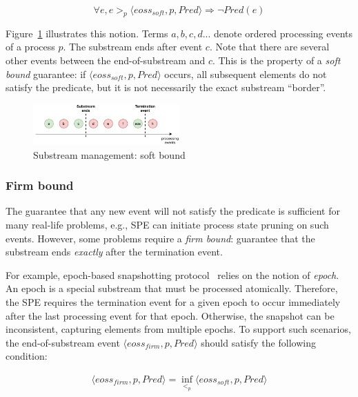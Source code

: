 \begin{equation}
\forall e, e >_p \langle eoss_{soft}, p, Pred\rangle \Rightarrow \neg Pred(e)
\end{equation}

Figure~\ref{general_guarantees} illustrates this notion. Terms $a,b,c,d...$ denote ordered processing events of a process $p$. The substream ends after event $c$. Note that there are several other events between the end-of-substream and $c$. This is the property of a {\em soft bound} guarantee: if $\langle eoss_{soft}, p, Pred\rangle$ occurs, all subsequent elements do not satisfy the predicate, but it is not necessarily the exact substream ``border''.

\begin{figure}[t]
  \centering
  \includegraphics[width=0.50\textwidth]{pics/general-guarantee.pdf}
  \caption{Substream management: soft bound}
  \label{general_guarantees}
\end{figure}

\subsubsection{Firm bound}

The guarantee that any new event will not satisfy the predicate is sufficient for many real-life problems, e.g., SPE can initiate process state pruning on such events. However, some problems require a {\em firm bound}: guarantee that the substream ends {\em exactly} after the termination event. 

For example, epoch-based snapshotting protocol~\cite{2015arXiv150608603C, jacques2016consistent} relies on the notion of {\em epoch}. An epoch is a special substream that must be processed atomically. Therefore, the SPE requires the termination event for a given epoch to occur immediately after the last processing event for that epoch. Otherwise, the snapshot can be inconsistent, capturing elements from multiple epochs. To support such scenarios, the end-of-substream event $\langle eoss_{firm}, p, Pred\rangle$ should satisfy the following condition:

\begin{equation}\begin{array}{l}
\langle eoss_{firm}, p, Pred\rangle = \inf_{<_p} \langle eoss_{soft}, p, Pred\rangle
\end{array}\end{equation}

